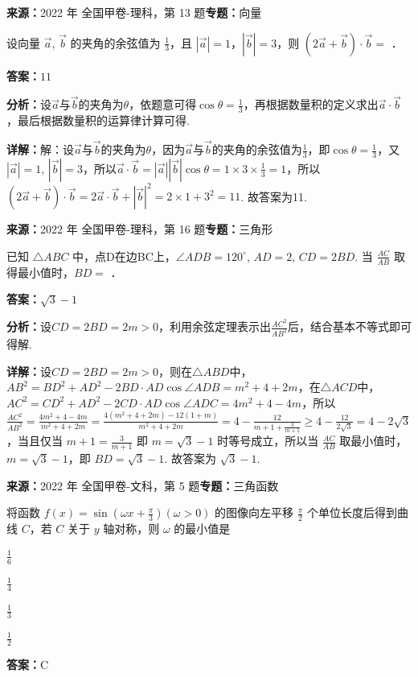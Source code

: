 \begin{question}[points=5]
\textbf{来源：}2022 年 全国甲卷-理科，第 13 题\quad \textbf{专题：}向量\par
设向量 $\vec{a}$, $\vec{b}$ 的夹角的余弦值为 $\frac{1}{3}$，且 $|\vec{a}|=1$，$|\vec{b}|=3$，则 $(2\vec{a}+\vec{b})\cdot\vec{b}=$ ．
\fillin[{$11$}]
\begin{solution}
\textbf{答案：}$11$

\textbf{分析：}设$\vec{a}$与$\vec{b}$的夹角为$\theta$，依题意可得$\cos\theta=\frac{1}{3}$，再根据数量积的定义求出$\vec{a}\cdot\vec{b}$，最后根据数量积的运算律计算可得.

\textbf{详解：}解：设$\vec{a}$与$\vec{b}$的夹角为$\theta$，因为$\vec{a}$与$\vec{b}$的夹角的余弦值为$\frac{1}{3}$，即$\cos\theta=\frac{1}{3}$，又$|\vec{a}|=1$, $|\vec{b}|=3$，所以$\vec{a}\cdot\vec{b}=|\vec{a}||\vec{b}|\cos\theta=1\times3\times\frac{1}{3}=1$，所以$(2\vec{a}+\vec{b})\cdot\vec{b}=2\vec{a}\cdot\vec{b}+|\vec{b}|^2=2\times1+3^2=11$. 故答案为11.
\end{solution}
\end{question}

\begin{question}[points=5]
\textbf{来源：}2022 年 全国甲卷-理科，第 16 题\quad \textbf{专题：}三角形\par
已知 $\triangle ABC$ 中，点D在边BC上，$\angle ADB=120^\circ$, $AD=2$, $CD=2BD$. 当 $\frac{AC}{AB}$ 取得最小值时，$BD=$ ．
\fillin[{$\sqrt{3}-1$}]
\begin{solution}
\textbf{答案：}$\sqrt{3}-1$

\textbf{分析：}设$CD=2BD=2m>0$，利用余弦定理表示出$\frac{AC^2}{AB^2}$后，结合基本不等式即可得解.

\textbf{详解：}设$CD=2BD=2m>0$，则在$\triangle ABD$中，$AB^2=BD^2+AD^2-2BD\cdot AD\cos\angle ADB=m^2+4+2m$，在$\triangle ACD$中，$AC^2=CD^2+AD^2-2CD\cdot AD\cos\angle ADC=4m^2+4-4m$，所以 $\frac{AC^2}{AB^2}=\frac{4m^2+4-4m}{m^2+4+2m}=\frac{4(m^2+4+2m)-12(1+m)}{m^2+4+2m}=4-\frac{12}{m+1+\frac{3}{m+1}} \geq 4-\frac{12}{2\sqrt{3}}=4-2\sqrt{3}$，当且仅当 $m+1=\frac{3}{m+1}$ 即 $m=\sqrt{3}-1$ 时等号成立，所以当 $\frac{AC}{AB}$ 取最小值时，$m=\sqrt{3}-1$，即 $BD=\sqrt{3}-1$. 故答案为 $\sqrt{3}-1$.
\end{solution}
\end{question}

\begin{question}[points=5]
\textbf{来源：}2022 年 全国甲卷-文科，第 5 题\quad \textbf{专题：}三角函数\par
将函数 $f(x)=\sin\left(\omega x+\frac{\pi}{3}\right) (\omega>0)$ 的图像向左平移 $\frac{\pi}{2}$ 个单位长度后得到曲线 $C$，若 $C$ 关于 $y$ 轴对称，则 $\omega$ 的最小值是
\begin{choices}
  \item $\frac{1}{6}$
  \item $\frac{1}{4}$
  \item $\frac{1}{3}$
  \item $\frac{1}{2}$
\end{choices}
\begin{solution}
\textbf{答案：}C
\end{solution}
\end{question}

